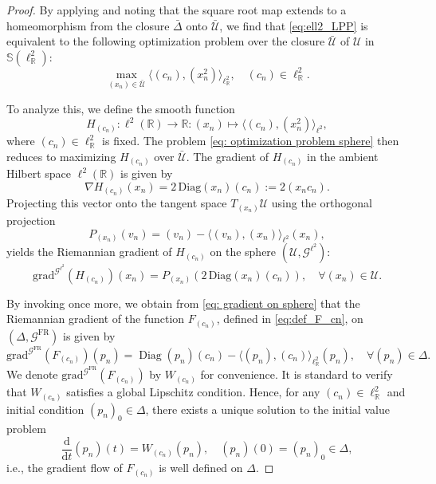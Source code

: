 \documentclass[12pt]{amsart}
\numberwithin{figure}{section}
\numberwithin{table}{section}
\numberwithin{equation}{section}
\def\RR{\mathbb{R}}
\def\Slr{\mathbb{S}\left(\ell_{\RR}^2 \right)}
\def\U{\mathcal{U}}
\def\Glt{\mathcal{G}^{\ell^2}}
\def\Gfr{\mathcal{G}^{\mathrm{FR}}}
\def\d{\mathrm{d}}
\newcommand{\R}{\mathbb{R}}
\begin{document}
\begin{proof}
By applying  and noting that the square root map extends to a homeomorphism from the closure \( \bar{\Delta} \) onto \( \bar{\U} \), we find that \eqref{eq:ell2_LPP} is equivalent to the following optimization problem over the closure \( \bar{\U} \) of \( \U \) in \( \Slr \):
\begin{equation}\tag{NLP}\label{eq: optimization problem sphere}
	\max_{(x_n) \in \bar{\U}} \langle (c_n), (x_n^2) \rangle_{\ell^2_\R}, \quad (c_n)\in \ell^2_\R.
\end{equation}

To analyze this, we define the smooth function
\[
H_{(c_n)}: \ell^2(\RR)\longrightarrow \RR: (x_n)\mapsto \langle (c_n), (x_n^2) \rangle_{\ell^2},
\]
where \( (c_n) \in \ell^2_{\mathbb{R}} \) is fixed. The problem \eqref{eq: optimization problem sphere} then reduces to maximizing \( H_{(c_n)} \) over \( \bar{\U} \). The gradient of \( H_{(c_n)} \) in the ambient Hilbert space \( \ell^2(\RR) \) is given by
\[
\nabla H_{(c_n)}(x_n) = 2\,\mathrm{Diag}(x_n)(c_n) := 2(x_n c_n).
\]
Projecting this vector onto the tangent space \( T_{(x_n)}\U \) using the orthogonal projection
\[
P_{(x_n)}(v_n) = (v_n) - \langle (v_n), (x_n) \rangle_{\ell^2} (x_n),
\]
yields the Riemannian gradient of \( H_{(c_n)} \) on the sphere \( (\U, \Glt) \):
\begin{equation}\label{eq: gradient on sphere}
	\mathrm{grad}^{\Glt}(H_{(c_n)})(x_n) = P_{(x_n)}\left( 2\,\mathrm{Diag}(x_n)(c_n) \right), \quad \forall (x_n)\in\U.
\end{equation}

By invoking  once more, we obtain from \eqref{eq: gradient on sphere} that the Riemannian gradient of the function \(F_{(c_n)}\), defined in \eqref{eq:def_F_cn}, on \( (\Delta, \Gfr) \) is given by
\begin{equation}\label{def:W_c}
\mathrm{grad}^{\Gfr}(F_{(c_n)})(p_n) = \operatorname{Diag}(p_n)(c_n) - \langle (p_n), (c_n) \rangle_{\ell^2_\R} (p_n), \quad \forall (p_n) \in \Delta.
\end{equation}
We denote \(\mathrm{grad}^{\Gfr}(F_{(c_n)})\) by \( W_{(c_n)} \) for convenience. It is standard to verify that \( W_{(c_n)} \) satisfies a global Lipschitz condition. Hence, for any \( (c_n) \in \ell^2_\R \) and initial condition \( (p_n)_0 \in \Delta \), there exists a unique solution to the initial value problem
\begin{equation}\label{eq:IVP}
	\frac{\d}{\d t}(p_n)(t) = W_{(c_n)}(p_n), \quad (p_n)(0) = (p_n)_0 \in \Delta,
\end{equation}
i.e., the gradient flow of \( F_{(c_n)} \) is well defined on \( \Delta \).


\end{proof}
\end{document}

